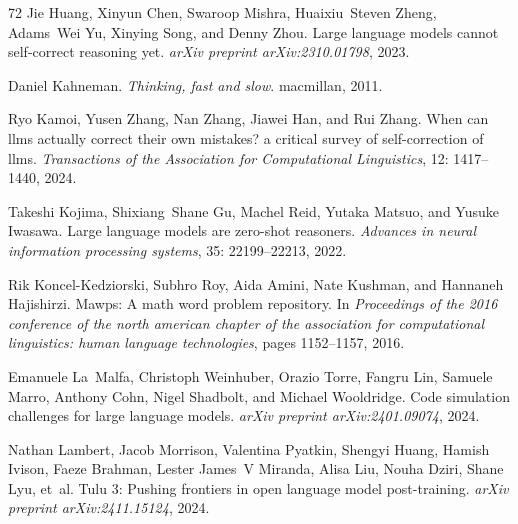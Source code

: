 \begin{thebibliography}{72}
Jie Huang, Xinyun Chen, Swaroop Mishra, Huaixiu~Steven Zheng, Adams~Wei Yu, Xinying Song, and Denny Zhou.
\newblock Large language models cannot self-correct reasoning yet.
\newblock \emph{arXiv preprint arXiv:2310.01798}, 2023.

Daniel Kahneman.
\newblock \emph{Thinking, fast and slow}.
\newblock macmillan, 2011.

Ryo Kamoi, Yusen Zhang, Nan Zhang, Jiawei Han, and Rui Zhang.
\newblock When can llms actually correct their own mistakes? a critical survey of self-correction of llms.
\newblock \emph{Transactions of the Association for Computational Linguistics}, 12: 1417--1440, 2024.

Takeshi Kojima, Shixiang~Shane Gu, Machel Reid, Yutaka Matsuo, and Yusuke Iwasawa.
\newblock Large language models are zero-shot reasoners.
\newblock \emph{Advances in neural information processing systems}, 35: 22199--22213, 2022.

Rik Koncel-Kedziorski, Subhro Roy, Aida Amini, Nate Kushman, and Hannaneh Hajishirzi.
\newblock Mawps: A math word problem repository.
\newblock In \emph{Proceedings of the 2016 conference of the north american chapter of the association for computational linguistics: human language technologies}, pages 1152--1157, 2016.

Emanuele La~Malfa, Christoph Weinhuber, Orazio Torre, Fangru Lin, Samuele Marro, Anthony Cohn, Nigel Shadbolt, and Michael Wooldridge.
\newblock Code simulation challenges for large language models.
\newblock \emph{arXiv preprint arXiv:2401.09074}, 2024.

Nathan Lambert, Jacob Morrison, Valentina Pyatkin, Shengyi Huang, Hamish Ivison, Faeze Brahman, Lester James~V Miranda, Alisa Liu, Nouha Dziri, Shane Lyu, et~al.
\newblock Tulu 3: Pushing frontiers in open language model post-training.
\newblock \emph{arXiv preprint arXiv:2411.15124}, 2024.


\end{thebibliography}
